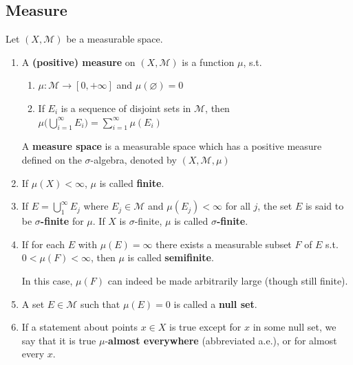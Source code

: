 \documentclass[12pt, a4paper, oneside]{book}
\begin{document}
\subsection{Measure} %
\begin{definition}
    Let $(X,\mathcal{M})$ be a measurable space. \begin{enumerate}
        \item
              A \textbf{(positive) measure} on $\left(X,\mathcal{M}\right)$ is a function $\mu$, s.t.
              \begin{enumerate}[label=(\roman*)]
                  \item
                        $\mu :\mathcal{M}\rightarrow \left[0,+\infty\right]$ and $\mu\left(\varnothing\right)=0$
                  \item
                        If $E_i$ is a sequence of disjoint sets in $\mathcal{M}$, then $\mu\biggl(\bigcup\limits_{i=1}^{\infty}E_{i}\biggr)=\sum\limits_{i=1}^{\infty}\mu(E_{i})$
              \end{enumerate}
              A \textbf{measure space} is a measurable space which has a positive measure defined on the $\sigma$-algebra, denoted by $\left(X,\mathcal{M},\mu\right)$

        \item
              If $\mu(X)<\infty$, $\mu$ is called \textbf{finite}.



        \item
              If $E=\bigcup_1^{\infty} E_j$ where $E_j \in \mathcal{M}$ and $\mu\left(E_j\right)<\infty$ for all $j$, the set $E$ is said to be \textbf{$\sigma$-finite} for $\mu$.
              If $X$ is $\sigma$-finite, $\mu$ is called \textbf{$\sigma$-finite}.

        \item
              If for each $E$ with $\mu(E)=\infty$ there exists a measurable subset $F$ of $E$ s.t. $0<\mu(F)<\infty$, then $\mu$ is called \textbf{semifinite}.
              \begin{remark}
                  In this case, $\mu(F)$ can indeed be made arbitrarily large (though still finite).
              \end{remark}
        \item
              A set $E \in \mathcal{M}$ such that $\mu(E)=0$ is called a \textbf{null set}.

        \item
              If a statement about points $x \in X$ is true except for $x$ in some null set, we say that it is true $\mu$-\textbf{almost everywhere} (abbreviated a.e.), or for almost every $x$.
    \end{enumerate}
\end{definition}
\end{document}
